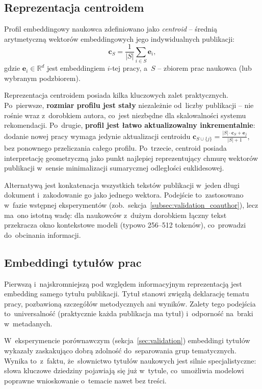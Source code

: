 \subsection{Reprezentacja centroidem}
\label{subsec:centroid}

Profil embeddingowy naukowca zdefiniowano jako \emph{centroid} --
średnią arytmetyczną wektorów embeddingowych jego indywidualnych
publikacji:
\begin{equation}
    \mathbf{c}_S = \frac{1}{|S|} \sum_{i \in S} \mathbf{e}_i,
    \label{eq:centroid_def}
\end{equation}
gdzie 
$\mathbf{e}_i \in \mathbb{R}^d$ 
jest embeddingiem $i$-tej pracy,
a~$S$ -- zbiorem prac naukowca (lub wybranym podzbiorem).

Reprezentacja centroidem posiada kilka kluczowych zalet praktycznych.
Po~pierwsze, \textbf{rozmiar profilu jest stały} niezależnie od~liczby
publikacji -- nie rośnie wraz z~dorobkiem autora, co~jest niezbędne
dla skalowalności systemu rekomendacji.
Po~drugie, \textbf{profil jest łatwo aktualizowalny inkrementalnie}:
dodanie nowej pracy wymaga jedynie aktualizacji centroidu
$\mathbf{c}_{S \cup \{j\}} = \frac{|S| \cdot \mathbf{c}_S + \mathbf{e}_j}{|S|+1}$,
bez ponownego przeliczania całego profilu.
Po~trzecie, centroid posiada interpretację geometryczną jako punkt
najlepiej reprezentujący chmurę wektorów publikacji w~sensie
minimalizacji sumarycznej odległości euklidesowej.

Alternatywą jest konkatenacja wszystkich tekstów publikacji
w~jeden długi dokument i~zakodowanie go jako jednego wektora.
Podejście to~zastosowano w~fazie wstępnej eksperymentów
(zob.\ sekcja~\ref{subsec:validation_coauthor}),
lecz ma~ono istotną wadę: dla naukowców z~dużym dorobkiem
łączny tekst przekracza okno kontekstowe modeli
(typowo 256--512 tokenów), co~prowadzi do~obcinania informacji.

\subsection{Embeddingi tytułów prac}
\label{subsec:titles}

Pierwszą i~najskromniejszą pod względem informacyjnym reprezentacją
jest embedding samego tytułu publikacji.
Tytuł stanowi zwięzłą deklarację tematu pracy, pozbawioną
szczegółów metodycznych ani wyników.
Zalety tego podejścia to~universalność (praktycznie każda publikacja
ma tytuł) i~odporność na~braki w~metadanych.

W~eksperymencie porównawczym (sekcja~\ref{sec:validation})
embeddingi tytułów wykazały zaskakująco dobrą zdolność
do~separowania grup tematycznych.
Wynika to~z~faktu, że~słownictwo tytułów naukowych jest
silnie specjalistyczne: słowa kluczowe dziedziny pojawiają się
już w~tytule, co~umożliwia modelowi poprawne wnioskowanie
o~temacie nawet bez treści.

